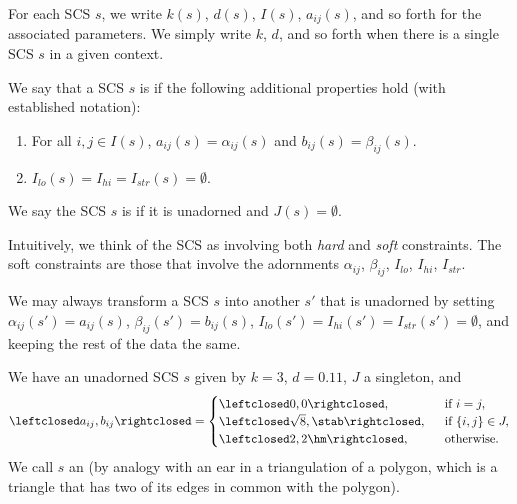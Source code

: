 For each SCS $s$, we write $k(s)$,
$d(s)$, $I(s)$, $a_{ij}(s)$, and so forth for the associated
parameters.   We simply write $k$, $d$, and so forth when there is a single
SCS $s$ in a given context.



%

\begin{definition}
We say that a SCS $s$ is  if the following additional
properties hold (with established notation):
\begin{enumerate}
\item For all $i,j\in I(s)$,  $a_{ij}(s)=\alpha_{ij}(s)$ and $b_{ij}(s)=\beta_{ij}(s)$.
\item $I_{lo}(s)=I_{hi}=I_{str}(s)=\emptyset$.
\end{enumerate}
We say the SCS $s$ is  if it is unadorned and $J(s)=\emptyset$.
\end{definition}

Intuitively, we think of the SCS as involving both {\it hard} and {\it
  soft} constraints.  The soft constraints are those that involve the
adornments $\alpha_{ij}$, $\beta_{ij}$, $I_{lo}$, $I_{hi}$, $I_{str}$.

\begin{example}\label{ex:extend-cs} 
We may always transform a SCS $s$ into another $s'$ that is unadorned by
setting $\alpha_{ij}(s')=a_{ij}(s)$, $\beta_{ij}(s')=b_{ij}(s)$, $I_{lo}(s')=I_{hi}(s')=I_{str}(s')=\emptyset$, and
keeping the rest of the data the same.
\end{example}


\begin{definition}[ear] 
We have an unadorned SCS $s$ given by
$k=3$, $d=0.11$, $J$ a singleton, 
and
\[
\leftclosed a_{ij},b_{ij}\rightclosed=
\begin{cases}
 \leftclosed0,0\rightclosed,
 &\text{~~if } i=j,\\
 \leftclosed\sqrt8,\stab\rightclosed,
 &\text{~~if } \{i,j\} \in J,\\
 \leftclosed 2,2\hm\rightclosed,
 &\text{~~otherwise. }
\end{cases}
\]
We call $s$ an  (by analogy with an ear
in a triangulation of a polygon, which is a triangle that has two of
its edges in common with the polygon).
\end{definition}


